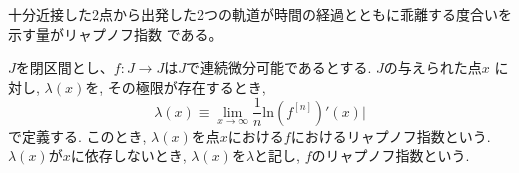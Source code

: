 \documentclass[12pt]{ltjsarticle}
\begin{document}
十分近接した2点から出発した2つの軌道が時間の経過とともに乖離する度合いを示す量がリャプノフ指数
である。\\
\begin{tcolorbox}
    $J$を閉区間とし、$f:J \rightarrow J$は$J$で連続微分可能であるとする. $J$の与えられた点$x$
    に対し, $\lambda(x)$を, その極限が存在するとき,
    \begin{equation*}
        \lambda(x) \equiv \lim_{x \to \infty} \frac{1}{n}\text{ln}\left(f^{[n]}\right)'(x)|
    \end{equation*}
    で定義する. このとき, $\lambda(x)$を点$x$における$f$におけるリャプノフ指数という.\\
    $\lambda(x)$が$x$に依存しないとき, $\lambda(x)$を$\lambda$と記し, $f$のリャプノフ指数という.
    
\end{tcolorbox}
\end{document}
